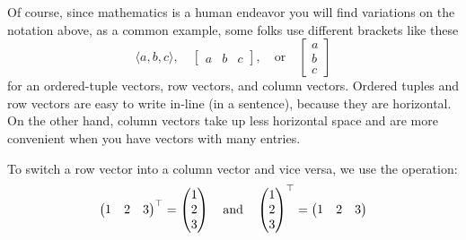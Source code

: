 \documentclass{ximera}
\begin{document}
\begin{concept}
\begin{description}
\end{description}
\end{concept}

Of course, since mathematics is a human endeavor you will find variations on the notation above, as a common example, some folks use different brackets like these
\[
\langle a, b, c\rangle, \quad \begin{bmatrix} a & b & c \end{bmatrix}, \quad \text{or}\quad
\begin{bmatrix}
  a\\
  b\\
  c
\end{bmatrix}
\]
for an ordered-tuple vectors, row vectors, and column vectors. Ordered
tuples and row vectors are easy to write in-line (in a sentence),
because they are horizontal. On the other hand, column vectors take up
less horizontal space and are more convenient when you have vectors
with many entries.


\begin{definition}
  To switch a row vector into a column vector and vice versa, we use the  operation:
  \[
  \begin{pmatrix} 1 &  2 & 3 \end{pmatrix}^\top =
  \begin{pmatrix} 1 \\ 2 \\ 3 \end{pmatrix}
  \quad\text{and}\quad
  \begin{pmatrix} 1 \\ 2 \\ 3 \end{pmatrix}^\top =
  \begin{pmatrix} 1 &  2 & 3 \end{pmatrix}
  \]
\end{definition}
\end{document}
